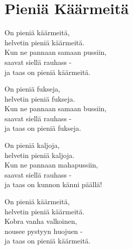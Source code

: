\section{Pieniä Käärmeitä}

On pieniä käärmeitä,\\
helvetin pieniä käärmeitä.\\
Kun ne pannaan samaan pussiin,\\ 
saavat siellä rauhass -\\
ja taas on pieniä käärmeitä. 

On pieniä fukseja,\\
helvetin pieniä fukseja.\\
Kun ne pannaan samaan bussiin,\\
saavat siellä rauhass -\\
ja taas on pieniä fukseja.

On pieniä kaljoja,\\
helvetin pieniä kaljoja.\\
Kun ne pannaan mahapussiin,\\
saavat siellä rauhass -\\
ja taas on kunnon känni päällä!

On pieniä käärmeitä,\\
helvetin pieniä käärmeitä.\\
Kobra vanha valkoinen,\\
nousee pystyyn huojuen -\\
ja taas on pieniä käärmeitä.